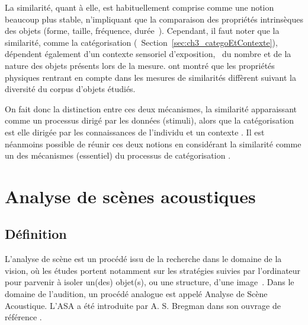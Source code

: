 {La similarité, quant à elle, est habituellement comprise comme une notion beaucoup plus stable, n'impliquant que la comparaison des propriétés intrinsèques des objets (forme, taille, fréquence, durée~\etc). Cependant, il faut noter que la similarité, comme la catégorisation (\cf~Section~\ref{sec:ch3_categoEtContexte}), dépendent également d'un contexte sensoriel d'exposition, \ie~du nombre et de la nature des objets présents lors de la mesure. \citep{tversky1977features,tversky1978studies} ont montré que les propriétés physiques rentrant en compte dans les mesures de similarités diffèrent suivant la diversité du corpus d'objets étudiés.

On fait donc la distinction entre ces deux mécanismes, la similarité apparaissant comme un processus dirigé par les données (stimuli), alors que la catégorisation est elle dirigée par les connaissances de l'individu et un contexte \citep[p. 59]{Houix03f}. Il est néanmoins possible de réunir ces deux notions en considérant la similarité comme un des mécanismes (essentiel) du processus de catégorisation \citep[p. 61-65]{Houix03f}. \\


\section{Analyse de scènes acoustiques}
\label{sec:ch3_ASA}


\subsection{Définition}
\label{sec:ASAintro}

L'analyse de scène est un procédé issu de la recherche dans le domaine de la vision, où les études portent notamment sur les stratégies suivies par l'ordinateur pour parvenir à isoler un(des) objet(s), ou une structure, d'une image~\citep[p. 12]{mcadams1994penser}. Dans le domaine de l'audition, un procédé analogue est appelé Analyse de Scène Acoustique. L'ASA a été introduite par A. S. Bregman dans son ouvrage de référence \citep{bregman1994auditory}.

}

